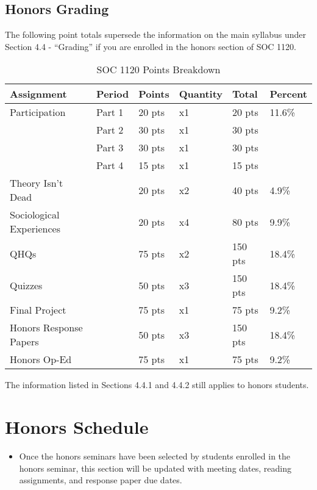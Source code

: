 \documentclass[
]{book}
\newenvironment{rmdblock}[1]
  {\begin{shaded*}
  \begin{itemize}
  \renewcommand{\labelitemi}{
    \raisebox{-.7\height}[0pt][0pt]{
      {\setkeys{Gin}{width=3em,keepaspectratio}\texttt{[image: images/\#1]}}
    }
  }
  \item
  }
  {
  \end{itemize}
  \end{shaded*}
  }
\newenvironment{rmdwarning}
  {\begin{rmdblock}{warning}}
  {\end{rmdblock}}
\begin{document}
\hypertarget{honors-grading}{%
\section{Honors Grading}\label{honors-grading}}

The following point totals supersede the information on the main syllabus under Section 4.4 - ``Grading'' if you are enrolled in the honors section of SOC 1120.

\begin{table}

\caption{\label{tab:unnamed-chunk-5}SOC 1120 Points Breakdown}
\centering
\begin{tabular}[t]{llllll}
\toprule
Assignment & Period & Points & Quantity & Total & Percent\\
\midrule
Participation & Part 1 & 20 pts & x1 & 20 pts & 11.6\%\\
 & Part 2 & 30 pts & x1 & 30 pts & \\
 & Part 3 & 30 pts & x1 & 30 pts & \\
 & Part 4 & 15 pts & x1 & 15 pts & \\
Theory Isn't Dead &  & 20 pts & x2 & 40 pts & 4.9\%\\
\addlinespace
Sociological Experiences &  & 20 pts & x4 & 80 pts & 9.9\%\\
QHQs &  & 75 pts & x2 & 150 pts & 18.4\%\\
Quizzes &  & 50 pts & x3 & 150 pts & 18.4\%\\
Final Project &  & 75 pts & x1 & 75 pts & 9.2\%\\
Honors Response Papers &  & 50 pts & x3 & 150 pts & 18.4\%\\
\addlinespace
Honors Op-Ed &  & 75 pts & x1 & 75 pts & 9.2\%\\
\bottomrule
\end{tabular}
\end{table}

The information listed in Sections 4.4.1 and 4.4.2 still applies to honors students.

\hypertarget{honors-schedule}{%
\chapter{Honors Schedule}\label{honors-schedule}}

\begin{rmdwarning}
Once the honors seminars have been selected by students enrolled in the
honors seminar, this section will be updated with meeting dates, reading
assignments, and response paper due dates.
\end{rmdwarning}

  
\end{document}
